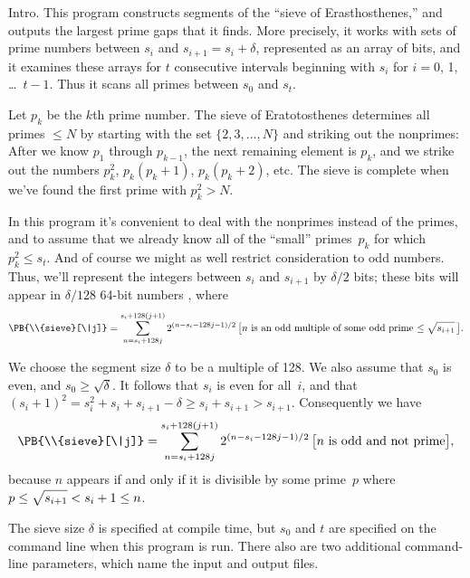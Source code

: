 
\hypertextrue\srcloctrue
\datethis

Intro. This program constructs segments of the ``sieve
of Erasthosthenes,''
and outputs the largest prime gaps that it finds. More precisely, it
works with sets of prime numbers between $s_i$ and $s_{i+1}=s_i+\delta$,
represented as an array of bits, and it examines these arrays for
$t$ consecutive intervals beginning with $s_i$ for $i=0$, 1, \dots~$t-1$.
Thus it scans all primes between $s_0$ and $s_t$.

Let $p_k$ be the $k$th prime number. The sieve of Eratotosthenes determines
all primes $\le N$ by starting with the set $\{2,3,\ldots,N\}$ and striking
out the nonprimes: After we know $p_1$ through $p_{k-1}$, the next remaining
element is $p_k$, and we strike out the numbers $p_k^2$, $p_k(p_k+1)$,
$p_k(p_k+2)$, etc. The sieve is complete when we've found the
first prime with $p_k^2>N$.

In this program it's convenient to deal with the nonprimes instead of the
primes, and to assume that we already know all of the ``small'' primes~$p_k$
for which $p_k^2\le s_t$.
And of course we might as well restrict consideration to odd numbers.
Thus, we'll represent the integers between $s_i$ and $s_{i+1}$ by
$\delta/2$ bits; these bits will appear in $\delta/128$ 64-bit numbers
, where
$$\PB{\\{sieve}[\|j]}=\sum_{n=s_i+128j}^{s_i+128(j+1)} 2^{(n-s_i-128j-1)/2}
\,\hbox{$\bigl[n$ is an odd multiple of some odd prime
$\le\sqrt{\mathstrut s_{i+1}}\,\bigr]$}.$$

We choose the segment size $\delta$ to be a multiple of 128.
We also assume that $s_0$ is even, and $s_0\ge\sqrt\delta$. It follows
that $s_i$ is even for all~$i$, and that $(s_i+1)^2=s_i^2+s_i+s_{i+1}-\delta
\ge s_i+s_{i+1}>s_{i+1}$. Consequently we have
$$\PB{\\{sieve}[\|j]}=\sum_{n=s_i+128j}^{s_i+128(j+1)} 2^{(n-s_i-128j-1)/2}
\,\hbox{$\bigl[n$ is odd and not prime$\bigr]$},$$
because $n$ appears if and only if it is divisible by some prime~$p$
where $p\le\sqrt{\mathstrut s_{i+1}}<s_i+1\le n$.

\fi

The sieve size $\delta$ is specified at compile time,
but $s_0$ and $t$ are specified on the command line when this program
is run. There also are two additional command-line parameters,
which name the input and output files.

